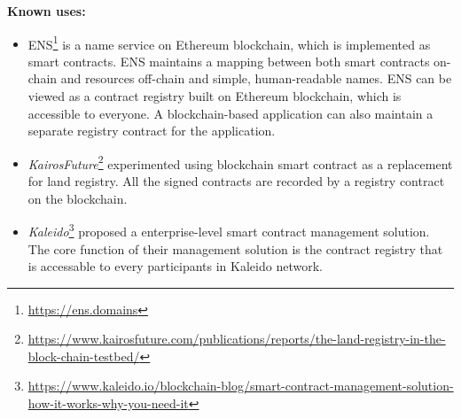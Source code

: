 \vspace{0.5em}\noindent \textbf{Known uses:}
\begin{itemize}
  \item ENS\footnote{\url{https://ens.domains}} is a name service on Ethereum blockchain, which is implemented as smart contracts. ENS maintains a mapping between  both smart contracts on-chain and resources off-chain and simple, human-readable names. ENS can be viewed as a contract registry built on Ethereum blockchain, which is accessible to everyone. A blockchain-based application can also maintain a separate registry contract for the application. 
  \item \textit{KairosFuture}\footnote{\url{https://www.kairosfuture.com/publications/reports/the-land-registry-in-the-block-chain-testbed/}} experimented using blockchain smart contract as a replacement for land registry. All the signed contracts are recorded by a registry contract on the blockchain.
  \item \textit{Kaleido}\footnote{\url{https://www.kaleido.io/blockchain-blog/smart-contract-management-solution-how-it-works-why-you-need-it}} proposed a enterprise-level smart contract management solution. The core function of their management solution is the contract registry that is accessable to every participants in Kaleido network. %
\end{itemize}









